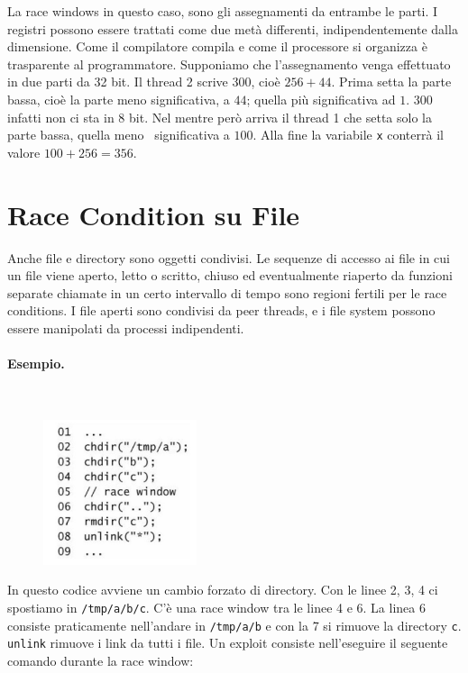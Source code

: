 La race windows in questo caso, sono gli assegnamenti da entrambe le parti.
I registri possono essere
trattati come due metà differenti, indipendentemente dalla dimensione.
Come il compilatore
compila e come il processore si organizza è trasparente al programmatore.
Supponiamo che l'assegnamento venga effettuato in due parti da 32 bit.
Il thread 2 scrive 300, cioè $256+44$. Prima setta la parte bassa,
cioè la parte meno
significativa, a $44$; quella più significativa ad $1$.
$300$ infatti non ci sta in 8 bit.
Nel mentre però arriva il thread 1 che setta solo la parte bassa, quella meno \
significativa a $100$.
Alla fine la variabile \verb|x| conterrà il valore $100+256=356$.

\section{Race Condition su File}

Anche file e directory sono oggetti condivisi.
Le sequenze di accesso ai file in cui un file viene aperto, letto o scritto,
chiuso ed
eventualmente riaperto da funzioni separate chiamate in un certo intervallo di
tempo sono
regioni fertili per le race conditions. I file aperti sono condivisi da
peer threads, e i file system
possono essere manipolati da processi indipendenti.

\paragraph{Esempio.}\ \\

\begin{figure}
    \centering
    \includegraphics[width=0.4\textwidth, keepaspectratio]{capitoli/secure_coding/img/cap_6/esempio_dir.png}
\end{figure}

In questo codice avviene un cambio forzato di directory.
Con le linee 2, 3, 4 ci spostiamo in
\verb|/tmp/a/b/c|.
C'è una race window tra le linee 4 e 6. La linea 6 consiste
praticamente nell'andare in \verb|/tmp/a/b| e con la 7 si rimuove la
directory \verb|c|. \verb|unlink| rimuove i link da tutti i file.
Un exploit consiste nell'eseguire il seguente comando durante
la race window:

